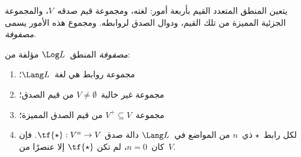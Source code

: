 \documentclass[../../../include/open-logic-section]{subfiles}
\begin{document}


يتعين المنطق المتعدد القيم بأربعة أمور: لغته، ومجموعة قيم صدقه~$V$،
والمجموعة الجزئية المميزة من تلك القيم، ودوال الصدق لروابطه. ومجموع
هذه الأمور يسمى \emph{مصفوفة}.

\begin{defn}[المصفوفة]
\emph{مصفوفة} المنطق~$\Log L$ مؤلفة من:
\begin{enumerate}
\item مجموعة روابط هي لغة~$\Lang L$؛
\item مجموعة غير خالية~$V \neq \emptyset$ من قيم الصدق؛
\item مجموعة~$V^+ \subseteq V$ من قيم الصدق المميزة؛
\item لكل رابط~$\star$ ذي~$n$ من المواضع في~$\Lang L$ دالة صدق
$\tf{\star} : V^n \to V$. فإن كان~$n = 0$، لم تكن
$\tf{\star}$ إلا عنصرًا من~$V$.
\end{enumerate}
\end{defn}
\end{document}
